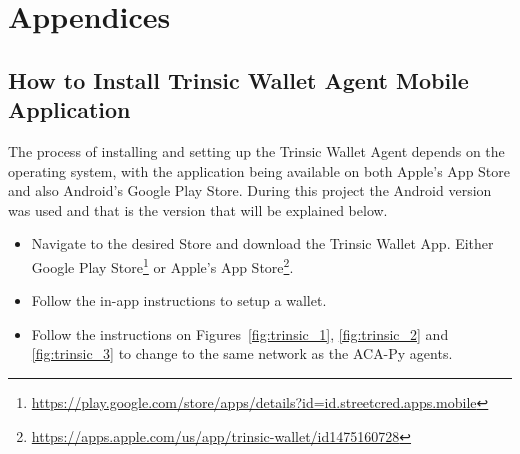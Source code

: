 \pagestyle{appendix}
\appendix
\section*{Appendices}
\renewcommand{\thesubsection}{\Alph{subsection}}

\subsection{How to Install Trinsic Wallet Agent Mobile Application}
\label{app:trinsic_installation}

The process of installing and setting up the Trinsic Wallet Agent depends on the operating system, with the application being available on both Apple's App Store and also Android's Google Play Store. During this project the Android version was used and that is the version that will be explained below.

\begin{itemize}
    \item Navigate to the desired Store and download the Trinsic Wallet App. Either Google Play Store\footnote{\url{https://play.google.com/store/apps/details?id=id.streetcred.apps.mobile}} or Apple's App Store\footnote{\url{https://apps.apple.com/us/app/trinsic-wallet/id1475160728}}.
    \item Follow the in-app instructions to setup a wallet.
    \item Follow the instructions on Figures~\ref{fig:trinsic_1}, \ref{fig:trinsic_2} and \ref{fig:trinsic_3} to change to the same network as the ACA-Py agents.
\end{itemize}

